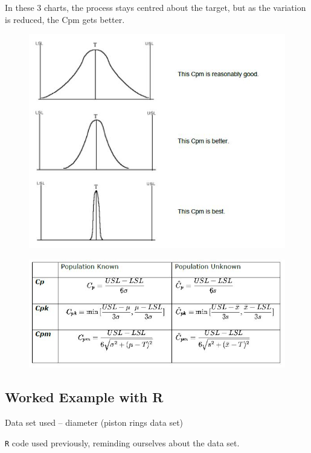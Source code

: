 \documentclass[MASTER-SPC.tex]{subfiles}
\begin{document}
			
\noindent  In these 3 charts, the process stays centred about the target, but as the variation is reduced, the Cpm gets better.
			\begin{figure}[h!]
				\centering
				\includegraphics[width=0.8\linewidth]{proccapindices/image7}
			\end{figure}
			
			\begin{figure}[h!]
				\centering
				\includegraphics[width=0.8\linewidth]{proccapindices/formulas}
			\end{figure}
			
			\newpage
			\subsection{Worked Example with R}
			
			Data set used – diameter (piston rings data set)
			
			\texttt{R} code used previously, reminding ourselves about the data set.
			
\end{document}
